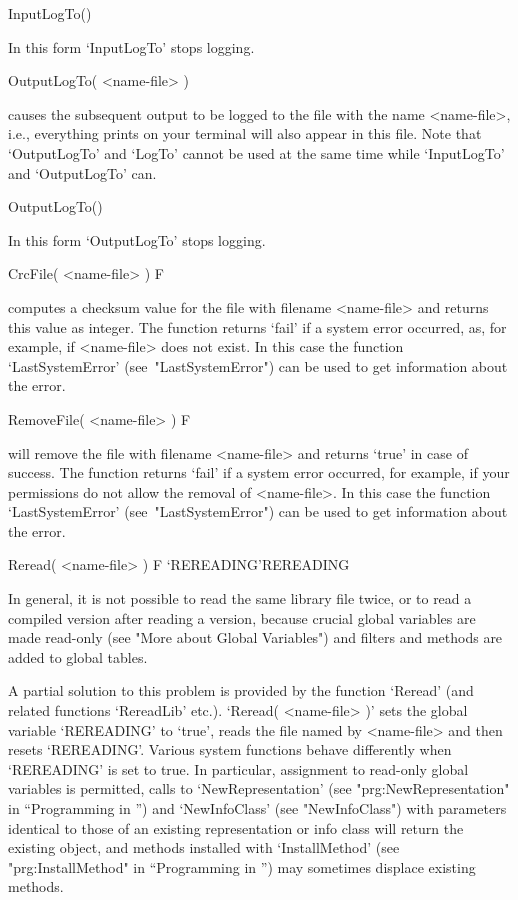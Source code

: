 \)InputLogTo()

In this form `InputLogTo' stops logging.

\>OutputLogTo( <name-file> )

causes   the subsequent output to   be logged to  the file  with the name
<name-file>,  i.e., everything {\GAP} prints  on  your terminal will also
appear in this file.  Note that  `OutputLogTo' and `LogTo' cannot be used
at the same time while `InputLogTo' and `OutputLogTo' can.

\)OutputLogTo()

In this form `OutputLogTo' stops logging.

\>CrcFile( <name-file> ) F

computes  a checksum  value for the  file  with filename <name-file>  and
returns this value  as integer. The function returns  `fail' if a  system
error occurred, as, for example, if <name-file> does not exist.
In this case the function `LastSystemError' (see~"LastSystemError")
can be used to get information about the error.

\>RemoveFile( <name-file> ) F

will remove the file with filename <name-file> and returns `true' in case
of  success.  The function returns `fail' if a system error occurred, for
example, if your permissions do not allow the removal of <name-file>.
In this case the function `LastSystemError' (see~"LastSystemError")
can be used to get information about the error.

\>Reread( <name-file> ) F
\>`REREADING'{REREADING}

In general, it is not possible to read the same {\GAP} library file
twice, or to read a compiled version after reading a {\GAP} version,
because crucial global variables are made read-only (see "More about
Global Variables") and filters and methods are added to global tables.

A partial solution to this problem is provided by the function
`Reread' (and related functions `RereadLib' etc.).  `Reread(
<name-file> )' sets the global variable `REREADING' to `true', reads
the file named by <name-file> and then resets `REREADING'. Various
system functions behave differently when `REREADING' is set to
true. In particular, assignment to read-only global variables is
permitted, calls to `NewRepresentation' (see "prg:NewRepresentation"
in ``Programming in {\GAP}'') and
`NewInfoClass' (see "NewInfoClass") with parameters identical to those
of an existing representation or info class will return the existing
object, and methods installed with `InstallMethod' (see
"prg:InstallMethod" in ``Programming in {\GAP}'') may sometimes displace
existing methods.

